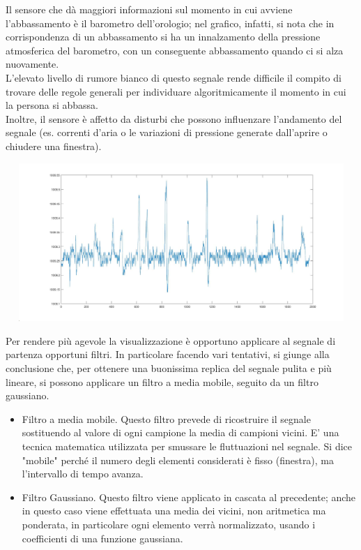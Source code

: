 \documentclass[a4paper]{article}
\begin{document}
Il sensore che dà maggiori informazioni sul momento in cui avviene l’abbassamento è il barometro dell'orologio; nel grafico, infatti, si nota che in corrispondenza di un abbassamento si ha un innalzamento della pressione atmosferica del barometro, con un conseguente abbassamento quando ci si alza nuovamente.\\
L’elevato livello di rumore bianco di questo segnale rende difficile il compito di trovare delle regole generali per individuare algoritmicamente il momento in cui la persona si abbassa. \\
Inoltre, il sensore è affetto da disturbi che possono influenzare l’andamento del segnale (es. correnti d’aria o le variazioni di pressione generate dall’aprire o chiudere una finestra).
\makebox[\linewidth]{}
\makebox[\linewidth]{}
\begin{minipage}{\linewidth}
\begin{center}
\includegraphics[width=160mm, height= 60mm]{./images/registrazione_tesi/pressure_watch.jpg} 
\end{center}
\end{minipage}
\makebox[\linewidth]{}
\makebox[\linewidth]{} 
Per rendere più agevole la visualizzazione è opportuno applicare al segnale di partenza opportuni filtri. In particolare facendo vari tentativi, si giunge alla conclusione che, per ottenere una buonissima replica del segnale pulita e più lineare, si possono applicare un filtro a media mobile, seguito da un filtro gaussiano.
\begin {itemize}
\item Filtro a media mobile. Questo filtro prevede di ricostruire il segnale sostituendo al valore di ogni campione la media di campioni vicini. E’ una tecnica matematica utilizzata per smussare le fluttuazioni nel segnale. Si dice "mobile" perché il numero degli elementi considerati è fisso (finestra), ma l'intervallo di tempo avanza.
\item Filtro Gaussiano. Questo filtro viene applicato in cascata al precedente; anche in questo caso viene effettuata una media dei vicini, non aritmetica ma ponderata, in particolare ogni elemento verrà normalizzato, usando i coefficienti di una funzione gaussiana.
\end{itemize}
\end{document}
